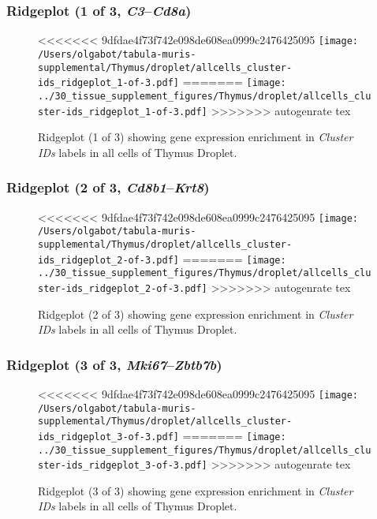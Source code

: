 \clearpage

\subsubsection{Ridgeplot (1 of 3, \emph{C3}--\emph{Cd8a})}
\begin{figure}[h]
\centering
<<<<<<< 9dfdae4f73f742e098de608ea0999c2476425095
\texttt{[image: /Users/olgabot/tabula-muris-supplemental/Thymus/droplet/allcells\_cluster-ids\_ridgeplot\_1-of-3.pdf]}
=======
\texttt{[image: ../30\_tissue\_supplement\_figures/Thymus/droplet/allcells\_cluster-ids\_ridgeplot\_1-of-3.pdf]}
>>>>>>> autogenrate tex

\caption{ Ridgeplot (1 of 3)  showing gene expression enrichment in \emph{Cluster IDs} labels in all cells of Thymus Droplet. }
\end{figure}


\clearpage

\subsubsection{Ridgeplot (2 of 3, \emph{Cd8b1}--\emph{Krt8})}
\begin{figure}[h]
\centering
<<<<<<< 9dfdae4f73f742e098de608ea0999c2476425095
\texttt{[image: /Users/olgabot/tabula-muris-supplemental/Thymus/droplet/allcells\_cluster-ids\_ridgeplot\_2-of-3.pdf]}
=======
\texttt{[image: ../30\_tissue\_supplement\_figures/Thymus/droplet/allcells\_cluster-ids\_ridgeplot\_2-of-3.pdf]}
>>>>>>> autogenrate tex

\caption{ Ridgeplot (2 of 3)  showing gene expression enrichment in \emph{Cluster IDs} labels in all cells of Thymus Droplet. }
\end{figure}


\clearpage

\subsubsection{Ridgeplot (3 of 3, \emph{Mki67}--\emph{Zbtb7b})}
\begin{figure}[h]
\centering
<<<<<<< 9dfdae4f73f742e098de608ea0999c2476425095
\texttt{[image: /Users/olgabot/tabula-muris-supplemental/Thymus/droplet/allcells\_cluster-ids\_ridgeplot\_3-of-3.pdf]}
=======
\texttt{[image: ../30\_tissue\_supplement\_figures/Thymus/droplet/allcells\_cluster-ids\_ridgeplot\_3-of-3.pdf]}
>>>>>>> autogenrate tex

\caption{ Ridgeplot (3 of 3)  showing gene expression enrichment in \emph{Cluster IDs} labels in all cells of Thymus Droplet. }
\end{figure}


